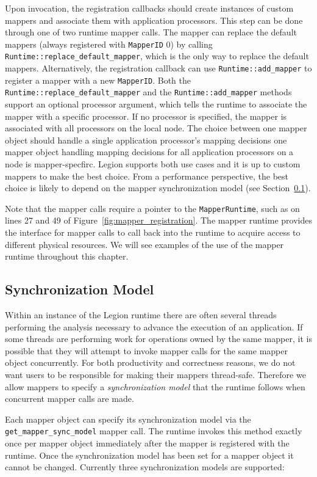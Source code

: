 Upon invocation, the registration callbacks should create instances
of custom mappers and associate them with application processors. 
This step can be done through one of two runtime mapper calls. The mapper
can replace the default mappers (always registered with {\tt MapperID}
0) by calling {\tt Runtime::replace\_default\_mapper}, which is the
only way to replace the default mappers. Alternatively, the registration
callback can use {\tt Runtime::add\_mapper} to register a mapper with a
new {\tt MapperID}. Both the {\tt Runtime::replace\_default\_mapper} and
the {\tt Runtime::add\_mapper} methods support an optional processor
argument, which tells the runtime to associate the mapper with a specific
processor. If no processor is specified, the mapper is associated 
with all processors on the local node. The choice between 
one mapper object should handle a single application processor's
mapping decisions one mapper object handling  mapping decisions for
all application processors on a node is mapper-specfirc. Legion supports both use cases
and it is up to custom mappers to make the best choice. From a performance
perspective, the best choice is likely to depend on the mapper synchronization
model (see Section~\ref{subsec:mapping:sync}).

Note that the mapper calls require a pointer to the {\tt MapperRuntime}, such as on
lines 27 and 49 of Figure~\ref{fig:mapper_registration}.
The mapper runtime provides the interface for mapper calls to call back
into the runtime to acquire access to different physical resources. We 
will see examples of the use of the mapper runtime throughout 
this chapter.

\subsection{Synchronization Model}
\label{subsec:mapping:sync}

Within an instance of the Legion runtime there are often several threads
performing the analysis necessary to advance the execution of an
application. If some threads are performing work for operations 
owned by the same mapper, it is possible that they will attempt to 
invoke mapper calls for the same mapper object concurrently. For both 
productivity and correctness reasons, we do not want users to be
responsible for making their mappers thread-safe. Therefore we allow
mappers to specify a {\em synchronization model} that the runtime 
follows when concurrent mapper calls are made.

Each mapper object can specify its synchronization model via the
{\tt get\_mapper\_sync\_model} mapper call. The runtime invokes this
method exactly once per mapper object immediately after the mapper is
registered with the runtime. Once the synchronization model has been set
for a mapper object it cannot be changed. Currently three
synchronization models are supported:

